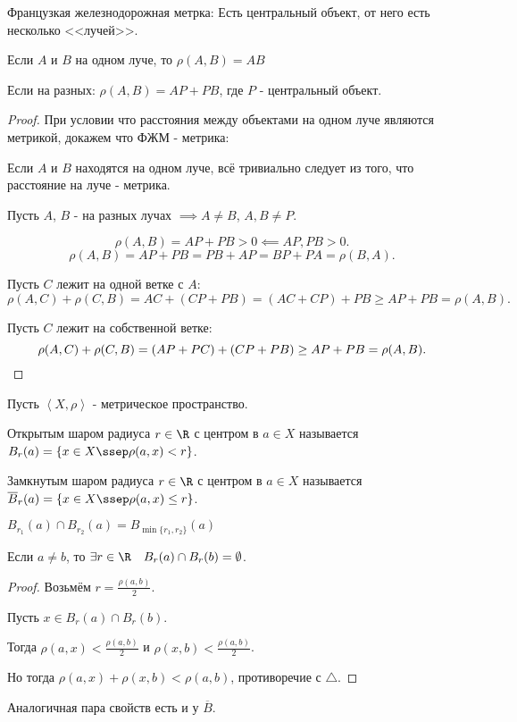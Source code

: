 \begin{example} \thmslashn

    Французкая железнодорожная метрка: Есть центральный объект, от него есть несколько <<лучей>>. 

    Если $A$ и $B$ на одном луче, то $\rho(A, B) = AB$

    Если на разных: $\rho(A, B) = AP + PB$, где $P$ - центральный объект.

    \begin{proof} \thmslashn
    
        При условии что расстояния между объектами на одном луче являются метрикой, докажем что ФЖМ - метрика:

        Если $A$ и $B$ находятся на одном луче, всё тривиально следует из того, что расстояние на луче - метрика.

        Пусть $A$, $B$ - на разных лучах $ \implies A \neq B$, $A, B \neq P$.

        \[ \rho(A, B) = AP + PB > 0 \impliedby AP, PB > 0 .\]
        \[ \rho(A, B) = AP + PB = PB + AP = BP + PA = \rho(B, A) .\]

        Пусть $C$ лежит на одной ветке с $A$:
        \[ \rho(A, C) + \rho(C, B) = AC + (CP + PB) = (AC + CP) + PB \ge  AP + PB = \rho(A, B) .\]

        Пусть $C$ лежит на собственной ветке:
        \[ \rho(A, C) + \rho(C, B) = (AP + PC) + (CP + PB) \ge  AP + PB = \rho(A, B). \qedhere\] 
    \end{proof}
\end{example}
\begin{definition} \thmslashn 

    Пусть $\left<X, \rho\right>$ - метрическое пространство.

    Открытым шаром радиуса $r\in \R$ с центром в $a\in X$ называется $B_r(a) = \{x\in X \ssep \rho(a, x) < r\}$.
    
    Замкнутым шаром радиуса $r\in \R$ с центром в $a\in X$ называется $\overline{B}_r(a) = \{x\in X \ssep \rho(a, x) \le  r\}$.
\end{definition}
\begin{properties} \thmslashn

    $B_{r_1}(a)\cap B_{r_2}(a) = B_{\min \{r_1, r_2\} }(a)$ 

    Если $a \neq b$, то $\exists{r\in \R}\quad B_{r}(a)\cap B_{r}(b) = \emptyset$.
    \begin{proof} \thmslashn
    
        Возьмём $r = \frac{\rho(a, b)}{2}$.

        Пусть $x\in B_{r}(a)\cap B_{r}(b)$.

        Тогда $\rho(a, x) < \frac{\rho(a, b)}{2}$ и $\rho(x, b) < \frac{\rho(a, b)}{2}$.

        Но тогда $\rho(a, x) + \rho(x, b) < \rho(a, b)$, противоречие с $\triangle$.
    \end{proof}

    Аналогичная пара свойств есть и у $\overline{B}$.
\end{properties}
